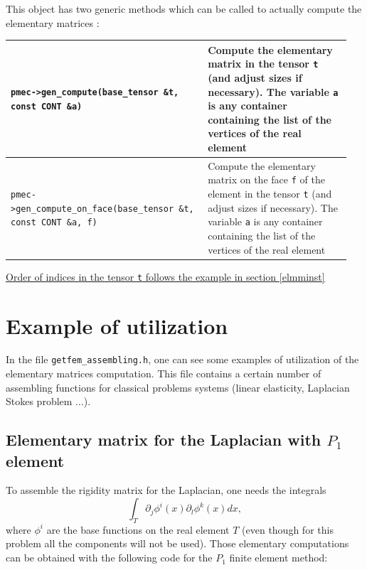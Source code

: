 \documentclass[11pt,a4paper]{article}
\begin{document}
This object has two generic methods which can be called to actually compute the elementary matrices :

\begin{center} \begin{tabular}{|m{0.55\linewidth}|m{0.4\linewidth}|} \hline
{\tt pmec->gen\_compute(base\_tensor \&t, const CONT \&a)} & Compute the elementary matrix in the tensor {\tt t} (and adjust sizes if necessary). The variable {\tt a} is any container containing the list of the vertices of the real element\\ \hline
{\tt pmec->gen\_compute\_on\_face(base\_tensor \&t, const CONT \&a, f)} & Compute the elementary matrix on the face {\tt f} of the element in the tensor {\tt t} (and adjust sizes if necessary). The variable {\tt a} is any container containing the list of the vertices of the real element\\ \hline
\end{tabular} \end{center}

\underline{Order of indices in the tensor {\tt t} follows the example in section \ref{elmminst}}

\section{Example of utilization}
In the file {\tt getfem\_assembling.h}, one can see some examples of utilization of the elementary matrices computation. This file contains a certain number of assembling functions for classical problems systems (linear elasticity, Laplacian Stokes problem ...).

\subsection{Elementary matrix for the Laplacian with $P_1$ element}

To assemble the rigidity matrix for the Laplacian, one needs the integrals
$$ \int_T \partial_j \phi^i(x) \partial_l \phi^k(x) dx, $$
where $\phi^i$ are the base functions on the real element $T$ (even though for this problem all the components will not be used). Those elementary computations can be obtained with the following code for the $P_1$ finite element method:
\end{document}
